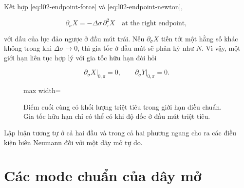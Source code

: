 Kết hợp \eqref{eq:l02-endpoint-force} và \eqref{eq:l02-endpoint-newton},

\begin{equation}
  \partial_\sigma X
  =
  -\Delta\sigma\,\partial_\tau^2X
  \quad\text{at the right endpoint},
  \label{eq:l02-endpoint-scaling}
\end{equation}

với dấu của lực đảo ngược ở đầu mút trái. Nếu \(\partial_\sigma X\) tiến tới một hằng số khác không trong khi \(\Delta\sigma\to0\), thì gia tốc ở đầu mút sẽ phân kỳ như \(N\). Vì vậy, một giới hạn liên tục hợp lý với gia tốc hữu hạn đòi hỏi

\begin{equation}
  \left.\partial_\sigma X\right|_{0,\pi}=0,
  \qquad
  \left.\partial_\sigma Y\right|_{0,\pi}=0.
  \label{eq:l02-open-neumann}
\end{equation}

\begin{figure}[H]
  \centering
  \begin{adjustbox}{max width=\linewidth}
  \end{adjustbox}
  \caption{Điểm cuối cùng có khối lượng triệt tiêu trong giới hạn điều chuẩn. Gia tốc hữu hạn chỉ có thể có khi độ dốc ở đầu mút triệt tiêu.}
  \label{fig:l02-neumann-redraw}
\end{figure}

Lập luận tương tự ở cả hai đầu và trong cả hai phương ngang cho ra các điều kiện biên Neumann đối với một dây mở tự do.

\section{Các mode chuẩn của dây mở}

